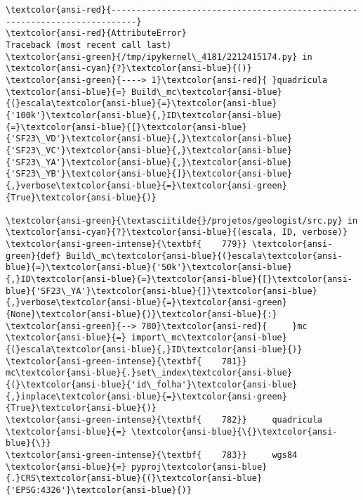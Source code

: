 \documentclass[11pt]{article}
\begin{document}
    \begin{Verbatim}[commandchars=\\\{\}, frame=single, framerule=2mm, rulecolor=\color{outerrorbackground}]
\textcolor{ansi-red}{---------------------------------------------------------------------------}
\textcolor{ansi-red}{AttributeError}                            Traceback (most recent call last)
\textcolor{ansi-green}{/tmp/ipykernel\_4181/2212415174.py} in \textcolor{ansi-cyan}{?}\textcolor{ansi-blue}{()}
\textcolor{ansi-green}{----> 1}\textcolor{ansi-red}{ }quadricula \textcolor{ansi-blue}{=} Build\_mc\textcolor{ansi-blue}{(}escala\textcolor{ansi-blue}{=}\textcolor{ansi-blue}{'100k'}\textcolor{ansi-blue}{,}ID\textcolor{ansi-blue}{=}\textcolor{ansi-blue}{[}\textcolor{ansi-blue}{'SF23\_VD'}\textcolor{ansi-blue}{,}\textcolor{ansi-blue}{'SF23\_VC'}\textcolor{ansi-blue}{,}\textcolor{ansi-blue}{'SF23\_YA'}\textcolor{ansi-blue}{,}\textcolor{ansi-blue}{'SF23\_YB'}\textcolor{ansi-blue}{]}\textcolor{ansi-blue}{,}verbose\textcolor{ansi-blue}{=}\textcolor{ansi-green}{True}\textcolor{ansi-blue}{)}

\textcolor{ansi-green}{\textasciitilde{}/projetos/geologist/src.py} in \textcolor{ansi-cyan}{?}\textcolor{ansi-blue}{(escala, ID, verbose)}
\textcolor{ansi-green-intense}{\textbf{    779}} \textcolor{ansi-green}{def} Build\_mc\textcolor{ansi-blue}{(}escala\textcolor{ansi-blue}{=}\textcolor{ansi-blue}{'50k'}\textcolor{ansi-blue}{,}ID\textcolor{ansi-blue}{=}\textcolor{ansi-blue}{[}\textcolor{ansi-blue}{'SF23\_YA'}\textcolor{ansi-blue}{]}\textcolor{ansi-blue}{,}verbose\textcolor{ansi-blue}{=}\textcolor{ansi-green}{None}\textcolor{ansi-blue}{)}\textcolor{ansi-blue}{:}
\textcolor{ansi-green}{--> 780}\textcolor{ansi-red}{     }mc \textcolor{ansi-blue}{=} import\_mc\textcolor{ansi-blue}{(}escala\textcolor{ansi-blue}{,}ID\textcolor{ansi-blue}{)}
\textcolor{ansi-green-intense}{\textbf{    781}}     mc\textcolor{ansi-blue}{.}set\_index\textcolor{ansi-blue}{(}\textcolor{ansi-blue}{'id\_folha'}\textcolor{ansi-blue}{,}inplace\textcolor{ansi-blue}{=}\textcolor{ansi-green}{True}\textcolor{ansi-blue}{)}
\textcolor{ansi-green-intense}{\textbf{    782}}     quadricula \textcolor{ansi-blue}{=} \textcolor{ansi-blue}{\{}\textcolor{ansi-blue}{\}}
\textcolor{ansi-green-intense}{\textbf{    783}}     wgs84 \textcolor{ansi-blue}{=} pyproj\textcolor{ansi-blue}{.}CRS\textcolor{ansi-blue}{(}\textcolor{ansi-blue}{'EPSG:4326'}\textcolor{ansi-blue}{)}


\end{Verbatim}
\end{document}

